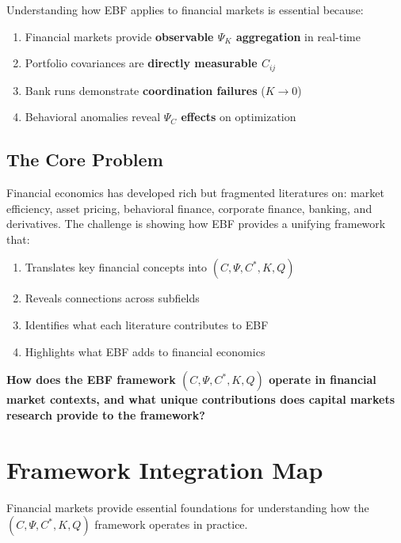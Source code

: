 Understanding how EBF applies to financial markets is essential because:
\begin{enumerate}
    \item Financial markets provide \textbf{observable $\Psi_K$ aggregation} in real-time
    \item Portfolio covariances are \textbf{directly measurable $C_{ij}$}
    \item Bank runs demonstrate \textbf{coordination failures} ($K \to 0$)
    \item Behavioral anomalies reveal \textbf{$\Psi_C$ effects} on optimization
\end{enumerate}

\subsection{The Core Problem}

Financial economics has developed rich but fragmented literatures on:
market efficiency, asset pricing, behavioral finance, corporate finance,
banking, and derivatives. The challenge is showing how EBF provides a
unifying framework that:
\begin{enumerate}
    \item Translates key financial concepts into $(C, \Psi, C^*, K, Q)$
    \item Reveals connections across subfields
    \item Identifies what each literature contributes to EBF
    \item Highlights what EBF adds to financial economics
\end{enumerate}

\begin{tcolorbox}[colback=red!5!white, colframe=red!75!black,
    title=The Fundamental Question]
\textbf{How does the EBF framework $(C, \Psi, C^*, K, Q)$ operate in financial
market contexts, and what unique contributions does capital markets research
provide to the framework?}
\end{tcolorbox}


\section{Framework Integration Map}
\label{sec:Y-integration-map}

Financial markets provide essential foundations for understanding how
the $(C, \Psi, C^*, K, Q)$ framework operates in practice.

